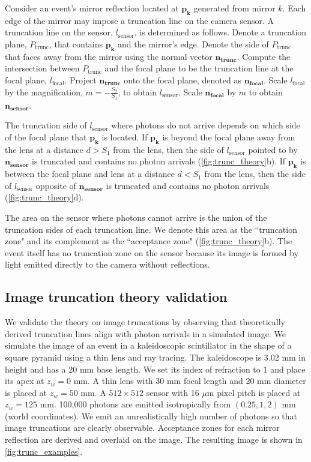 Consider an event's mirror reflection located at $\bm{p_k}$ generated from mirror $k$.
Each edge of the mirror may impose a truncation line on the camera sensor.
A truncation line on the sensor, $l_\text{sensor}$, is determined as follows.
Denote a truncation plane, $P_{\text{trunc}}$, that contains $\bm{p_k}$ and the 
mirror's edge.
Denote the side of $P_{\text{trunc}}$ that faces away from the mirror using the 
normal vector $\bm{n_{\text{trunc}}}$.
Compute the intersection between $P_{\text{trunc}}$ and the focal plane to be the
truncation line at the focal plane, $l_\text{focal}$.
Project $\bm{n_{\text{trunc}}}$ onto the focal plane, denoted as 
$\bm{n_{\text{focal}}}$.
Scale $l_\text{focal}$ by the magnification, $m=-\frac{S_2}{S_1}$, to obtain $l_\text{sensor}$.
Scale $\bm{n_{\text{focal}}}$ by $m$ to obtain $\bm{n_{\text{sensor}}}$.

The truncation side of $l_\text{sensor}$ where photons do not arrive depends on 
which side of the focal plane that $\bm{p_k}$ is located.
If $\bm{p_k}$ is beyond the focal plane away from the lens at a distance $d>S_1$ 
from the lens, 
then the side of $l_\text{sensor}$ pointed to by $\bm{n_{\text{sensor}}}$ is 
truncated and contains no photon arrivals (\cref{fig:trunc_theory}b).
If $\bm{p_k}$ is between the focal plane and lens at a distance $d<S_1$ from the lens, 
then the side of $l_\text{sensor}$ opposite of $\bm{n_{\text{sensor}}}$ 
is truncated and contains no photon arrivals (\cref{fig:trunc_theory}d).

The area on the sensor where photons cannot arrive is the union of the
truncation sides of each truncation line.
We denote this area as the ``truncation zone" and its complement as the 
``acceptance zone" (\cref{fig:trunc_theory}b).
The event itself has no truncation zone on the sensor because its image is formed 
by light emitted directly to the camera without reflections.

\subsection{Image truncation theory validation}
We validate the theory on image truncations by observing that theoretically 
derived truncation lines align with photon arrivals in a simulated image.
We simulate the image of an event in a kaleidoscopic scintillator in the shape of 
a square pyramid using a thin lens and ray tracing. 
The kaleidoscope is 3.02 mm in height and has a 20 mm base length.
We set its index of refraction to 1 and place its apex at $z_w=0$ mm.
A thin lens with 30 mm focal length and 20 mm diameter is placed at $z_w=50$ mm.
A $512 \times 512$ sensor with 16 $\mu$m pixel pitch is placed at $z_w=125$ mm.
100,000 photons are emitted isotropically from $(0.25, 1, 2)$ mm (world 
coordinates).
We emit an unrealistically high number of photons so that image truncations are 
clearly observable.
Acceptance zones for each mirror reflection are derived and overlaid on the image.
The resulting image is shown in \cref{fig:trunc_examples}.

